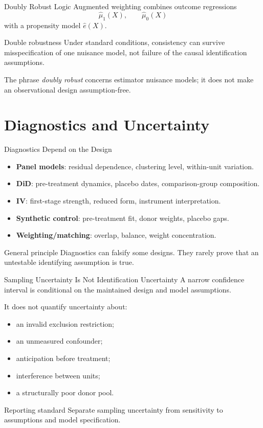 \documentclass[aspectratio=169,11pt]{beamer}
\begin{document}
\begin{frame}{Doubly Robust Logic}
Augmented weighting combines outcome regressions
\[
\widehat{\mu}_1(X),\qquad \widehat{\mu}_0(X)
\]
with a propensity model \(\widehat e(X)\).

\begin{block}{Double robustness}
Under standard conditions, consistency can survive misspecification of one nuisance model, not failure of the causal identification assumptions.
\end{block}

The phrase \emph{doubly robust} concerns estimator nuisance models; it does not make an observational design assumption-free.
\end{frame}

\section{Diagnostics and Uncertainty}

\begin{frame}{Diagnostics Depend on the Design}
\begin{itemize}
\item \textbf{Panel models}: residual dependence, clustering level, within-unit variation.
\item \textbf{DiD}: pre-treatment dynamics, placebo dates, comparison-group composition.
\item \textbf{IV}: first-stage strength, reduced form, instrument interpretation.
\item \textbf{Synthetic control}: pre-treatment fit, donor weights, placebo gaps.
\item \textbf{Weighting/matching}: overlap, balance, weight concentration.
\end{itemize}

\begin{alertblock}{General principle}
Diagnostics can falsify some designs. They rarely prove that an untestable identifying assumption is true.
\end{alertblock}
\end{frame}

\begin{frame}{Sampling Uncertainty Is Not Identification Uncertainty}
A narrow confidence interval is conditional on the maintained design and model assumptions.

It does not quantify uncertainty about:
\begin{itemize}
\item an invalid exclusion restriction;
\item an unmeasured confounder;
\item anticipation before treatment;
\item interference between units;
\item a structurally poor donor pool.
\end{itemize}

\begin{block}{Reporting standard}
Separate sampling uncertainty from sensitivity to assumptions and model specification.
\end{block}
\end{frame}
\end{document}
